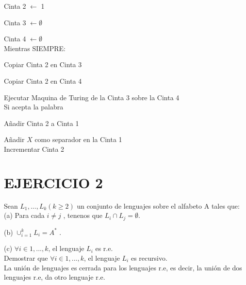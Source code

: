 \documentclass{article}
\begin{document}
\hspace{1.5cm}Cinta 2 $\leftarrow$ 1

\hspace{1.5cm}Cinta 3 $\leftarrow \emptyset$

\hspace{1.5cm}Cinta 4 $\leftarrow \emptyset$\\

\hspace{1cm}Mientras SIEMPRE:

\hspace{1.5cm}Copiar Cinta 2 en Cinta 3

\hspace{1.5cm}Copiar Cinta 2 en Cinta 4

\hspace{1.5cm}Ejecutar Maquina de Turing de la Cinta 3 sobre la Cinta 4\\

\hspace{1.5cm}Si acepta la palabra

\hspace{2cm}Añadir Cinta 2 a Cinta 1

\hspace{2cm}Añadir $X$ como separador en la Cinta 1\\

\hspace{1.5cm}Incrementar Cinta 2

\newpage

\section{EJERCICIO 2}

Sean $L_{1} ,..., L_{k} (k \ge 2)$ un conjunto de lenguajes sobre el alfabeto A tales que:\\

(a) Para cada $i \neq j$ , tenenos que $L_{i} \cap L_{j} = \emptyset$.

(b) $\cup_{i=1}^{k} L_{i} = A^{*}$ .

(c) $\forall i\in {1,..., k}$, el lenguaje $L_{i}$ es r.e.\\

Demostrar que $\forall i\in {1,..., k}$, el lenguaje $L_{i}$ es recursivo. \\

La unión de lenguajes es cerrada para los lenguajes r.e, es decir, la unión de dos lenguajes r.e, da otro lenguaje r.e.\\
\end{document}
